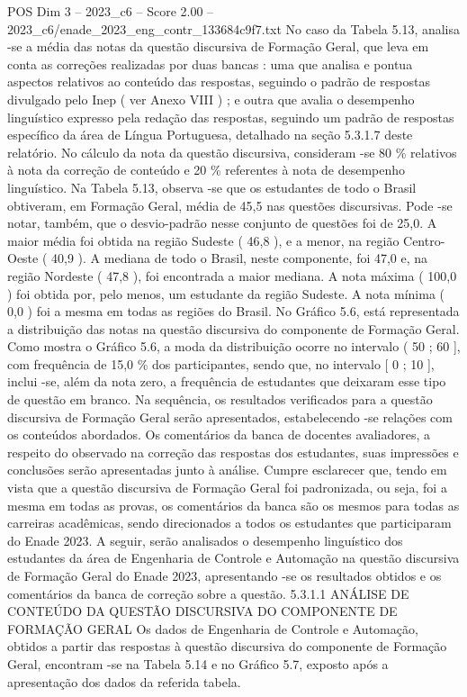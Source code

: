 \begin{textsample}{POS Dim 3 – 2023\_c6 – Score 2.00 – 2023\_c6/enade\_2023\_eng\_contr\_133684c9f7.txt}
No caso da Tabela 5.13, analisa -se a média das notas da questão discursiva de Formação Geral, que leva em conta as correções realizadas por duas bancas : uma que analisa e pontua aspectos relativos ao conteúdo das respostas, seguindo o padrão de respostas divulgado pelo Inep ( ver Anexo VIII ) ; e outra que avalia o desempenho linguístico expresso pela redação das respostas, seguindo um padrão de respostas específico da área de Língua Portuguesa, detalhado na seção 5.3.1.7 deste relatório.
No cálculo da nota da questão discursiva, consideram -se 80 \% relativos à nota da correção de conteúdo e 20 \% referentes à nota de desempenho linguístico.
Na Tabela 5.13, observa -se que os estudantes de todo o Brasil obtiveram, em Formação Geral, média de 45,5 nas questões discursivas.
Pode -se notar, também, que o desvio-padrão nesse conjunto de questões foi de 25,0.
A maior média foi obtida na região Sudeste ( 46,8 ), e a menor, na região Centro-Oeste ( 40,9 ).
A mediana de todo o Brasil, neste componente, foi 47,0 e, na região Nordeste ( 47,8 ), foi encontrada a maior mediana.
A nota máxima ( 100,0 ) foi obtida por, pelo menos, um estudante da região Sudeste.
A nota mínima ( 0,0 ) foi a mesma em todas as regiões do Brasil.
No Gráfico 5.6, está representada a distribuição das notas na questão discursiva do componente de Formação Geral.
Como mostra o Gráfico 5.6, a moda da distribuição ocorre no intervalo ( 50 ; 60 ], com frequência de 15,0 \% dos participantes, sendo que, no intervalo [ 0 ; 10 ], inclui -se, além da nota zero, a frequência de estudantes que deixaram esse tipo de questão em branco.
Na sequência, os resultados verificados para a questão discursiva de Formação Geral serão apresentados, estabelecendo -se relações com os conteúdos abordados.
Os comentários da banca de docentes avaliadores, a respeito do observado na correção das respostas dos estudantes, suas impressões e conclusões serão apresentadas junto à análise.
Cumpre esclarecer que, tendo em vista que a questão discursiva de Formação Geral foi padronizada, ou seja, foi a mesma em todas as provas, os comentários da banca são os mesmos para todas as carreiras acadêmicas, sendo direcionados a todos os estudantes que participaram do Enade 2023.
A seguir, serão analisados o desempenho linguístico dos estudantes da área de Engenharia de Controle e Automação na questão discursiva de Formação Geral do Enade 2023, apresentando -se os resultados obtidos e os comentários da banca de correção sobre a questão. 5.3.1.1 ANÁLISE DE CONTEÚDO DA QUESTÃO DISCURSIVA DO COMPONENTE DE FORMAÇÃO GERAL Os dados de Engenharia de Controle e Automação, obtidos a partir das respostas à questão discursiva do componente de Formação Geral, encontram -se na Tabela 5.14 e no Gráfico 5.7, exposto após a apresentação dos dados da referida tabela.

\end{textsample}
